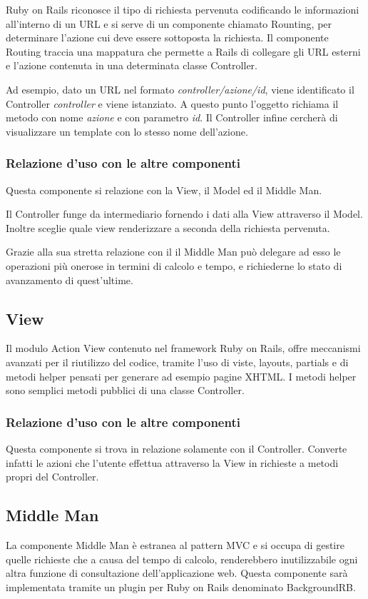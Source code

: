 \documentclass[11pt,a4paper]{article}
\begin{document}
Ruby on Rails riconosce il tipo di richiesta pervenuta codificando le informazioni all'interno di un URL e si serve di un componente chiamato Rounting, per determinare l'azione cui deve essere sottoposta la richiesta.
Il componente Routing traccia una mappatura che permette a Rails di collegare gli URL esterni e l'azione contenuta in una determinata classe Controller.

Ad esempio, dato un URL nel formato \textit{controller/azione/id}, viene identificato il Controller \textit{controller} e viene istanziato. A questo punto l'oggetto richiama il metodo con nome \textit{azione} e con parametro \textit{id}. Il Controller infine cercherà di visualizzare un template con lo stesso nome dell'azione. 
\subsubsection{Relazione d'uso con le altre componenti}
Questa componente si relazione con la View, il Model ed il Middle Man. 

Il Controller funge da intermediario fornendo i dati alla View attraverso il Model. Inoltre sceglie quale view renderizzare a seconda della richiesta pervenuta.

Grazie alla sua stretta relazione con il il Middle Man può delegare ad esso le operazioni più onerose in termini di calcolo e tempo, e richiederne lo stato di avanzamento di quest'ultime.
\subsection{View}\label{view}
 Il modulo Action View contenuto nel framework Ruby on Rails, offre meccanismi avanzati per il riutilizzo del codice, tramite l'uso di viste, layouts, partials e di metodi helper pensati per generare ad esempio pagine XHTML.
I metodi helper sono semplici metodi pubblici di una classe Controller.
\subsubsection{Relazione d'uso con le altre componenti}
Questa componente si trova in relazione solamente con il Controller. Converte infatti le azioni che l'utente effettua attraverso la View in richieste a metodi propri del Controller.
\subsection{Middle Man}
La componente Middle Man è estranea al pattern MVC e si occupa di gestire quelle richieste che a causa del tempo di calcolo, renderebbero inutilizzabile ogni altra funzione di consultazione dell'applicazione web. Questa componente sarà implementata tramite un plugin per Ruby on Rails denominato BackgroundRB.
\end{document}
